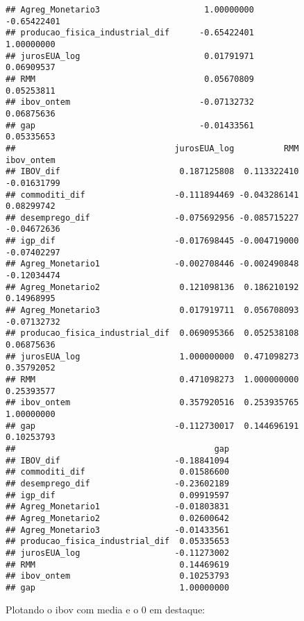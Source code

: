 \documentclass[
]{article}
\begin{document}
\begin{verbatim}
## Agreg_Monetario3                     1.00000000                    -0.65422401
## producao_fisica_industrial_dif      -0.65422401                     1.00000000
## jurosEUA_log                         0.01791971                     0.06909537
## RMM                                  0.05670809                     0.05253811
## ibov_ontem                          -0.07132732                     0.06875636
## gap                                 -0.01433561                     0.05335653
##                                jurosEUA_log          RMM  ibov_ontem
## IBOV_dif                        0.187125808  0.113322410 -0.01631799
## commoditi_dif                  -0.111894469 -0.043286141  0.08299742
## desemprego_dif                 -0.075692956 -0.085715227 -0.04672636
## igp_dif                        -0.017698445 -0.004719000 -0.07402297
## Agreg_Monetario1               -0.002708446 -0.002490848 -0.12034474
## Agreg_Monetario2                0.121098136  0.186210192  0.14968995
## Agreg_Monetario3                0.017919711  0.056708093 -0.07132732
## producao_fisica_industrial_dif  0.069095366  0.052538108  0.06875636
## jurosEUA_log                    1.000000000  0.471098273  0.35792052
## RMM                             0.471098273  1.000000000  0.25393577
## ibov_ontem                      0.357920516  0.253935765  1.00000000
## gap                            -0.112730017  0.144696191  0.10253793
##                                        gap
## IBOV_dif                       -0.18841094
## commoditi_dif                   0.01586600
## desemprego_dif                 -0.23602189
## igp_dif                         0.09919597
## Agreg_Monetario1               -0.01803831
## Agreg_Monetario2                0.02600642
## Agreg_Monetario3               -0.01433561
## producao_fisica_industrial_dif  0.05335653
## jurosEUA_log                   -0.11273002
## RMM                             0.14469619
## ibov_ontem                      0.10253793
## gap                             1.00000000
\end{verbatim}

Plotando o ibov com media e o 0 em destaque:
\end{document}

